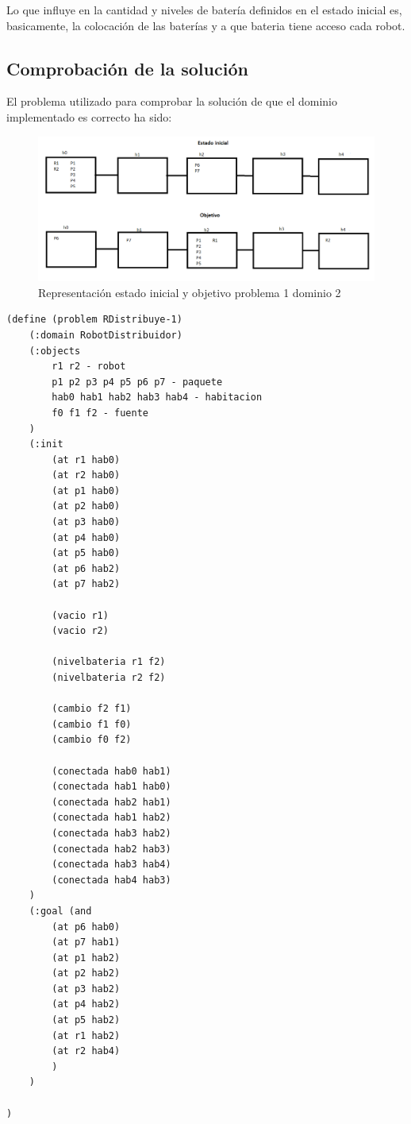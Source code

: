 	Lo que influye en la cantidad y niveles de batería definidos en el estado inicial es, basicamente, la colocación de las baterías y a que bateria tiene acceso cada robot.
	

\subsection{Comprobación de la solución}

El problema utilizado para comprobar la solución de que el dominio implementado es correcto ha sido:

\begin{figure}[h]
	\centering
	\includegraphics[width=1\linewidth]{p2}
	\caption{Representación estado inicial y objetivo problema 1 dominio 2}
	\label{fig:p1}
\end{figure}

	\begin{lstlisting}[language=SH]
(define (problem RDistribuye-1)
	(:domain RobotDistribuidor)
	(:objects
		r1 r2 - robot
		p1 p2 p3 p4 p5 p6 p7 - paquete
		hab0 hab1 hab2 hab3 hab4 - habitacion
		f0 f1 f2 - fuente
	)
	(:init
		(at r1 hab0)
		(at r2 hab0)
		(at p1 hab0)
		(at p2 hab0)
		(at p3 hab0)
		(at p4 hab0)
		(at p5 hab0)
		(at p6 hab2)
		(at p7 hab2)
		
		(vacio r1)
		(vacio r2)
		
		(nivelbateria r1 f2)
		(nivelbateria r2 f2)
		
		(cambio f2 f1)
		(cambio f1 f0)
		(cambio f0 f2)
		
		(conectada hab0 hab1)
		(conectada hab1 hab0)
		(conectada hab2 hab1)
		(conectada hab1 hab2)
		(conectada hab3 hab2)
		(conectada hab2 hab3)
		(conectada hab3 hab4)
		(conectada hab4 hab3)
	)
	(:goal (and
		(at p6 hab0)
		(at p7 hab1)
		(at p1 hab2)
		(at p2 hab2)
		(at p3 hab2)
		(at p4 hab2)
		(at p5 hab2)
		(at r1 hab2)
		(at r2 hab4)
		)
	)

)
	\end{lstlisting}
	

